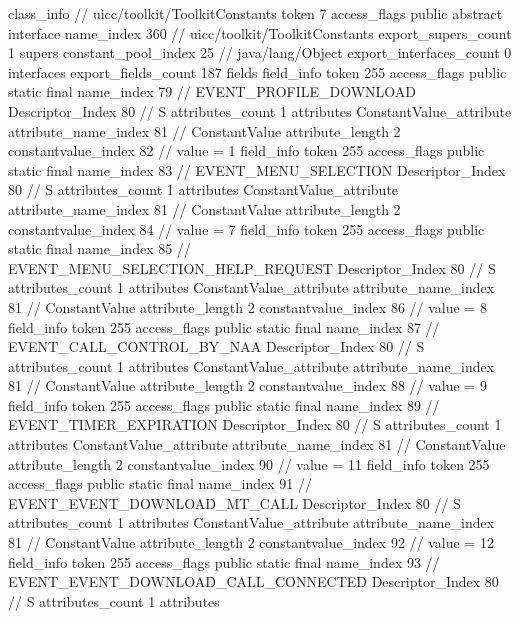 {{{{			}
		}
		class_info {		// uicc/toolkit/ToolkitConstants
			token	7
			access_flags	public abstract interface
			name_index	360		// uicc/toolkit/ToolkitConstants
			export_supers_count	1
			supers {
				constant_pool_index	25		// java/lang/Object
			}
			export_interfaces_count	0
			interfaces {
			}
			export_fields_count	187
			fields {
			field_info {
				token	255
				access_flags	public static final
				name_index	79		// EVENT_PROFILE_DOWNLOAD
				Descriptor_Index	80		// S
				attributes_count	1
				attributes {
				ConstantValue_attribute {
					attribute_name_index	81		// ConstantValue
					attribute_length	2
					constantvalue_index	82		// value = 1
				}
				}
			}
			field_info {
				token	255
				access_flags	public static final
				name_index	83		// EVENT_MENU_SELECTION
				Descriptor_Index	80		// S
				attributes_count	1
				attributes {
				ConstantValue_attribute {
					attribute_name_index	81		// ConstantValue
					attribute_length	2
					constantvalue_index	84		// value = 7
				}
				}
			}
			field_info {
				token	255
				access_flags	public static final
				name_index	85		// EVENT_MENU_SELECTION_HELP_REQUEST
				Descriptor_Index	80		// S
				attributes_count	1
				attributes {
				ConstantValue_attribute {
					attribute_name_index	81		// ConstantValue
					attribute_length	2
					constantvalue_index	86		// value = 8
				}
				}
			}
			field_info {
				token	255
				access_flags	public static final
				name_index	87		// EVENT_CALL_CONTROL_BY_NAA
				Descriptor_Index	80		// S
				attributes_count	1
				attributes {
				ConstantValue_attribute {
					attribute_name_index	81		// ConstantValue
					attribute_length	2
					constantvalue_index	88		// value = 9
				}
				}
			}
			field_info {
				token	255
				access_flags	public static final
				name_index	89		// EVENT_TIMER_EXPIRATION
				Descriptor_Index	80		// S
				attributes_count	1
				attributes {
				ConstantValue_attribute {
					attribute_name_index	81		// ConstantValue
					attribute_length	2
					constantvalue_index	90		// value = 11
				}
				}
			}
			field_info {
				token	255
				access_flags	public static final
				name_index	91		// EVENT_EVENT_DOWNLOAD_MT_CALL
				Descriptor_Index	80		// S
				attributes_count	1
				attributes {
				ConstantValue_attribute {
					attribute_name_index	81		// ConstantValue
					attribute_length	2
					constantvalue_index	92		// value = 12
				}
				}
			}
			field_info {
				token	255
				access_flags	public static final
				name_index	93		// EVENT_EVENT_DOWNLOAD_CALL_CONNECTED
				Descriptor_Index	80		// S
				attributes_count	1
				attributes {
}}}}}}
